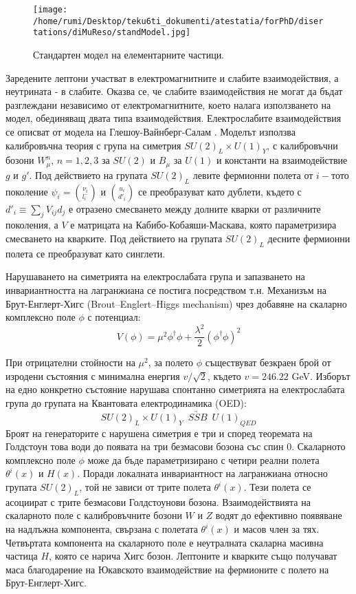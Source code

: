 \begin{figure}
\centering
\texttt{[image: /home/rumi/Desktop/teku6ti\_dokumenti/atestatia/forPhD/disertations/diMuReso/standModel.jpg]}
\caption{Стандартен модел на елементарните частици.}
\label{fig:standModel}
\end{figure}

\par Заредените лептони участват в електромагнитните и слабите взаимодействия, а неутрината - в слабите. Оказва се, че слабите взаимодействия не могат да бъдат разглеждани независимо от електромагнитните, което налага използването на модел, обединяващ двата типа взаимодействия. Електрослабите взаимодействия се описват от модела на Глешоу-Вайнберг-Салам \cite{Glashow,Weinberg,Salam}. Моделът използва калибровъчна теория с група на симетрия $SU(2)_L\times U(1)_Y$, с калибровъчни бозони $W_{\mu}^n,\, n = 1, 2, 3$ за $SU(2)$  и $B_{\mu}$ за $U(1)$ и константи на взаимодействие $g$ и $g'$.
Под действието на групата $SU(2)_L$ левите фермионни полета от $i-$тото поколение $\psi_i = \binom{\nu_i}{l_i^{-}}$ и $\binom{u_i}{d'_i}$ се преобразуват като дублети, където с $d'_i\equiv \sum_j V_{ij}d_j$ е отразено смесването между долните кварки от различните поколения, а $V$ е матрицата на Кабибо-Кобаяши-Маскава, която параметризира смесването на кварките. Под действието на групата $SU(2)_L$ десните фермионни полета се преобразуват като синглети.
\par Нарушаването на симетрията на електрослабата група и запазването на инвариантността на лагранжиана се постига посредством т.н. Механизъм на Брут-Енглерт-Хигс (Brout–Englert–Higgs mechanism) \cite{higgsOr,englert} чрез добавяне на скаларно комплексно поле $\phi$  с потенциал: 
\begin{equation}
V(\phi) = \mu^2 \phi^{\dagger}\phi + \frac{\lambda^2}{2} (\phi^{\dagger}\phi)^2
\end{equation}
\par При отрицателни стойности на $\mu^2$, за полето $\phi$ съществуват безкраен брой от изродени състояния с минимална енергия $v/\sqrt{2}$, където $v = 246.22$ GeV. Изборът на едно конкретно състояние нарушава спонтанно симетрията на електрослабата група до групата на Квантовата електродинамика (OED):
\begin{equation}
SU(2)_L\times U(1)_Y\,\,\, \underrightarrow{SSB}\,\,\, U(1)_{QED}
\end{equation}
Броят на генераторите с нарушена симетрия е три и според теоремата на Голдстоун това води до появата на три безмасови бозона със спин $0$. Скаларното комплексно поле $\phi$ може да бъде параметризирано с четири реални полета $\theta^i(x)$ и $H(x)$. Поради локалната инвариантност на лагранжиана относно групата $SU(2)_L$, той не зависи от трите полета $\theta^i(x)$. Тези полета се асоциират с трите безмасови Голдстоунови бозона. Взаимодействията на скаларното поле с калибровъчните бозони $W$ и $Z$  водят до ефективно появяване на надлъжна компонента, свързана с полетата  $\theta^i(x)$ и масов член за тях. Четвъртата компонента на скаларното поле е неутралната скаларна масивна частица $H$, която се нарича Хигс бозон. Лептоните и кварките също получават маса благодарение на Юкавското взаимодействие на фермионите с полето на Брут-Енглерт-Хигс.
